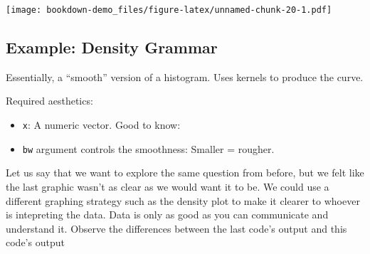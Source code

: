 \documentclass[]{book}
\newenvironment{Shaded}{\begin{snugshade}}{\end{snugshade}}
\newcommand{\KeywordTok}[1]{\textcolor[rgb]{0.13,0.29,0.53}{\textbf{#1}}}
\newcommand{\DataTypeTok}[1]{\textcolor[rgb]{0.13,0.29,0.53}{#1}}
\newcommand{\DecValTok}[1]{\textcolor[rgb]{0.00,0.00,0.81}{#1}}
\newcommand{\StringTok}[1]{\textcolor[rgb]{0.31,0.60,0.02}{#1}}
\newcommand{\OperatorTok}[1]{\textcolor[rgb]{0.81,0.36,0.00}{\textbf{#1}}}
\newcommand{\NormalTok}[1]{#1}
\begin{document}
\begin{Shaded}
\end{Shaded}

\texttt{[image: bookdown-demo\_files/figure-latex/unnamed-chunk-20-1.pdf]}

\subsection{Example: Density Grammar}\label{example-density-grammar}

Essentially, a ``smooth'' version of a histogram. Uses kernels to
produce the curve.

Required aesthetics:

\begin{itemize}
\item
  \texttt{x}: A numeric vector. Good to know:
\item
  \texttt{bw} argument controls the smoothness: Smaller = rougher.
\end{itemize}

Let us say that we want to explore the same question from before, but we
felt like the last graphic wasn't as clear as we would want it to be. We
could use a different graphing strategy such as the density plot to make
it clearer to whoever is intepreting the data. Data is only as good as
you can communicate and understand it. Observe the differences between
the last code's output and this code's output
\end{document}
